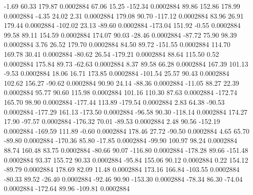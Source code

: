        -1.69       60.33      179.87     0.0002884
       67.06       15.25     -152.34     0.0002884
       89.86      152.86      178.99     0.0002884
       -4.35       24.02        2.31     0.0002884
      179.08       90.70     -117.12     0.0002884
       83.96       26.91      179.44     0.0002884
     -102.02       23.13      -89.60     0.0002884
     -173.04      151.92       -0.55     0.0002884
       99.58       89.11      154.59     0.0002884
      174.07       90.03      -28.46     0.0002884
      -87.72       75.90       98.39     0.0002884
        3.76       26.52      179.70     0.0002884
       84.50       89.72     -151.55     0.0002884
      114.70      169.78       30.41     0.0002884
      -80.62       26.54     -179.21     0.0002884
       88.64      115.50        0.52     0.0002884
      175.84       89.73      -62.63     0.0002884
        8.37       89.58       66.28     0.0002884
      167.39      101.13       -9.53     0.0002884
       18.06       16.71      173.85     0.0002884
     -101.54       25.57       90.43     0.0002884
      102.62      156.27      -90.62     0.0002884
       90.90       24.14      -88.36     0.0002884
      -11.05       88.27       22.39     0.0002884
       95.77       90.60      115.98     0.0002884
      101.16      110.30       87.63     0.0002884
     -172.74      165.70       98.90     0.0002884
     -177.44      113.89     -179.54     0.0002884
        2.83       64.38      -90.53     0.0002884
     -177.29      161.13     -173.50     0.0002884
      -96.58       90.30     -118.14     0.0002884
      174.27       17.90      -97.57     0.0002884
     -176.32       70.01      -89.53     0.0002884
        2.48       90.56     -152.19     0.0002884
     -169.59      111.89       -0.60     0.0002884
      178.46       27.72      -90.50     0.0002884
        4.65       65.70      -89.80     0.0002884
     -170.36       85.80      -17.85     0.0002884
      -99.90      100.97       98.24     0.0002884
       88.74      160.48       83.75     0.0002884
      -80.66       90.07     -116.80     0.0002884
     -178.28       89.66     -151.48     0.0002884
       93.37      155.72       90.33     0.0002884
      -95.84      155.06       90.12     0.0002884
        0.22      154.12      -89.79     0.0002884
      178.69       82.09       11.48     0.0002884
      173.16      166.84     -103.55     0.0002884
      -80.33       89.52      -26.40     0.0002884
      -92.46       90.90     -153.30     0.0002884
      -78.34       86.30      -74.04     0.0002884
     -172.64       89.96     -109.81     0.0002884
